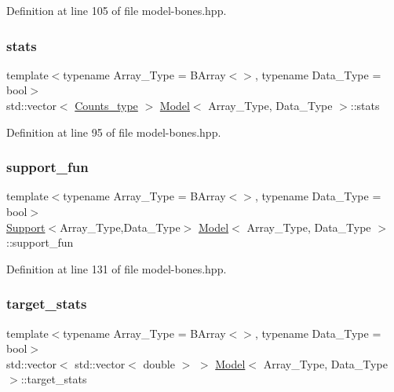 Definition at line 105 of file model-\/bones.\+hpp.

\mbox{\label{class_model_a1816b0dd69226394643dc31916c8645e}} 
\subsubsection{\texorpdfstring{stats}{stats}}
{\footnotesize\ttfamily template$<$typename Array\+\_\+\+Type  = B\+Array$<$$>$, typename Data\+\_\+\+Type  = bool$>$ \\
std\+::vector$<$ \hyperlink{typedefs_8hpp_aee40fa17c1fddb63dd1f2b1470ade95b}{Counts\+\_\+type} $>$ \hyperlink{class_model}{Model}$<$ Array\+\_\+\+Type, Data\+\_\+\+Type $>$\+::stats}



Definition at line 95 of file model-\/bones.\+hpp.

\mbox{\label{class_model_a192302b6d7402bd4ef6edae623074ad0}} 
\subsubsection{\texorpdfstring{support\+\_\+fun}{support\_fun}}
{\footnotesize\ttfamily template$<$typename Array\+\_\+\+Type  = B\+Array$<$$>$, typename Data\+\_\+\+Type  = bool$>$ \\
\hyperlink{class_support}{Support}$<$Array\+\_\+\+Type,Data\+\_\+\+Type$>$ \hyperlink{class_model}{Model}$<$ Array\+\_\+\+Type, Data\+\_\+\+Type $>$\+::support\+\_\+fun}



Definition at line 131 of file model-\/bones.\+hpp.

\mbox{\label{class_model_ab0f4642a2d4602fabb6774914b7dbd39}} 
\subsubsection{\texorpdfstring{target\+\_\+stats}{target\_stats}}
{\footnotesize\ttfamily template$<$typename Array\+\_\+\+Type  = B\+Array$<$$>$, typename Data\+\_\+\+Type  = bool$>$ \\
std\+::vector$<$ std\+::vector$<$ double $>$ $>$ \hyperlink{class_model}{Model}$<$ Array\+\_\+\+Type, Data\+\_\+\+Type $>$\+::target\+\_\+stats}



